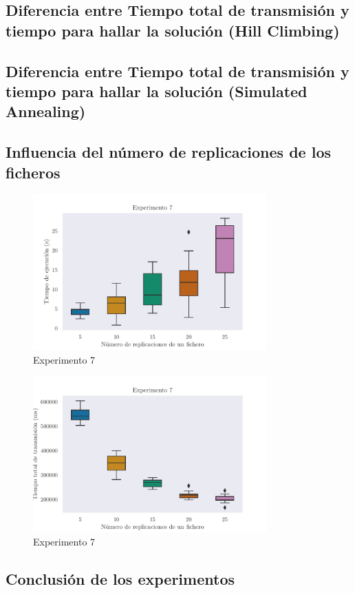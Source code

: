 

\subsection{Diferencia entre Tiempo total de transmisión y tiempo para hallar la solución (Hill Climbing)}

\subsection{Diferencia entre Tiempo total de transmisión y tiempo para hallar la solución (Simulated Annealing)}

\subsection{Influencia del número de replicaciones de los ficheros}



\begin{figure}[H]
\centering
\includegraphics[width=0.8\textwidth]{include/plots/ex7_time_bplot.pdf}
\caption{Experimento 7}%
\label{fig:ex7time}
\end{figure}

\begin{figure}[H]
\centering
\includegraphics[width=0.8\textwidth]{include/plots/ex7_ttt_bplot.pdf}
\caption{Experimento 7}%
\label{fig:ex7ttt}
\end{figure}

\subsection{Conclusión de los experimentos}
    
    
    
